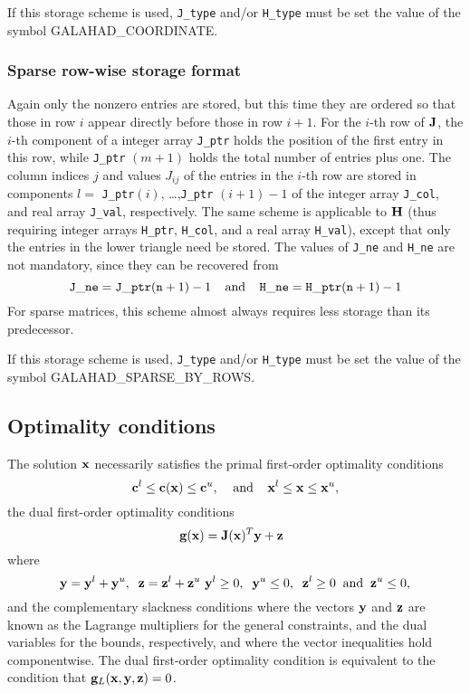 \documentclass{galahad}
\newcommand{\sym}{\sf\small}
\begin{document}
\noindent
If this storage scheme is used, {\tt J\_type} and/or {\tt H\_type} must be set
the value of the symbol {\sym GALAHAD\_COORDINATE}.

\subsubsection{Sparse row-wise storage format}\label{rowwise}

Again only the nonzero entries are stored, but this time
they are ordered so that those in row $i$ appear directly before those
in row $i+1$. For the $i$-th row of ${\mathbf{J}}$, the $i$-th component of a 
integer array {\tt J\_ptr} holds the position of the first entry in this row,
while {\tt J\_ptr} $(m+1)$ holds the total number of entries plus one.
The column indices $j$ and values $J_{ij}$ of the entries in the $i$-th row 
are stored in components 
$l =$ {\tt J\_ptr}$(i)$, \ldots ,{\tt J\_ptr} $(i+1)-1$ of the 
integer array {\tt J\_col}, and real array {\tt J\_val}, respectively. 
The same scheme is applicable to
${\mathbf{H}}$ (thus requiring integer arrays {\tt H\_ptr}, {\tt H\_col}, and 
a real array {\tt H\_val}),
except that only the entries in the lower triangle need be stored.
The values of {\tt J\_ne} and {\tt H\_ne} are not mandatory, since they can be
recovered from
\[
{\tt J\_ne} = {\tt J\_ptr}({\tt n}+1) - 1
\;\;\;\; \mbox{and} \;\;\;\;
{\tt H\_ne} = {\tt H\_ptr}({\tt n}+1) - 1
\]
For sparse matrices, this scheme almost always requires less storage than 
its predecessor.

\noindent
If this storage scheme is used, {\tt J\_type} and/or {\tt H\_type} must be set
the value of the symbol {\sym GALAHAD\_SPARSE\_BY\_ROWS}.


\subsection{Optimality conditions\label{galopt}}

The solution ${\mathbf{x}}$ necessarily satisfies 
the primal first-order optimality conditions
\[
{\mathbf{c}}^l \leq {\mathbf{c}}({\mathbf{x}}) \leq {\mathbf{c}}^u,
\;\;\;\; \mbox{and} \;\;\;\;
{\mathbf{x}}^l \leq {\mathbf{x}} \leq {\mathbf{x}}^u,
\]
the dual first-order optimality conditions
\[
{\mathbf{g}}( {\mathbf{x}} ) = {\mathbf{J}}({\mathbf{x}})^{T} {\mathbf{y}} + {\mathbf{z}} \;\;
\]
where
\[
{\mathbf{y}} = {\mathbf{y}}^{l} + {\mathbf{y}}^{u}, \;\;
 {\mathbf{z}} = {\mathbf{z}}^{l} + {\mathbf{z}}^{u}\,\,
 {\mathbf{y}}^{l} \geq 0 , \;\;
 {\mathbf{y}}^{u} \leq 0 , \;\;
 {\mathbf{z}}^{l} \geq 0 \;\; \mbox{and} \;\;
 {\mathbf{z}}^{u} \leq 0 ,
\]
and the complementary slackness conditions 
where the vectors ${\mathbf{y}}$ and ${\mathbf{z}}$ are 
known as the Lagrange multipliers for
the general constraints, and the dual variables for the bounds,
respectively, and where the vector inequalities hold componentwise.
The dual first-order optimality condition is equivalent to
the condition that ${\mathbf{g}}_L( {\mathbf{x}},{\mathbf{y}}, {\mathbf{z}}) = 0$.
\end{document}
